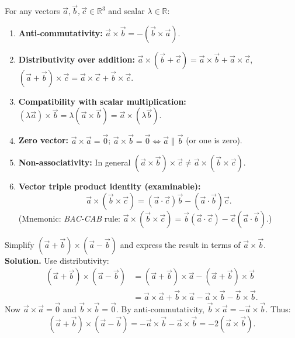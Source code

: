 \documentclass[11pt]{article}
\begin{document}
\begin{propriete}
For any vectors $\vec{a},\vec{b},\vec{c}\in\mathbb{R}^3$ and scalar $\lambda\in\mathbb{R}$:
\begin{enumerate}
\item \textbf{Anti-commutativity:} $\vec{a}\times\vec{b} = -(\vec{b}\times\vec{a})$.
\item \textbf{Distributivity over addition:}
$\vec{a}\times(\vec{b}+\vec{c}) = \vec{a}\times\vec{b}+\vec{a}\times\vec{c}$,
$(\vec{a}+\vec{b})\times\vec{c} = \vec{a}\times\vec{c}+\vec{b}\times\vec{c}$.
\item \textbf{Compatibility with scalar multiplication:}
$(\lambda\vec{a})\times\vec{b} = \lambda(\vec{a}\times\vec{b}) = \vec{a}\times(\lambda\vec{b})$.
\item \textbf{Zero vector:} $\vec{a}\times\vec{a}=\vec{0}$; $\vec{a}\times\vec{b}=\vec{0} \iff \vec{a}\parallel\vec{b}$ (or one is zero).
\item \textbf{Non-associativity:} In general $(\vec{a}\times\vec{b})\times\vec{c} \neq \vec{a}\times(\vec{b}\times\vec{c})$.
\item \textbf{Vector triple product identity (examinable):}
\[
\vec{a}\times(\vec{b}\times\vec{c}) = (\vec{a}\cdot\vec{c})\vec{b} - (\vec{a}\cdot\vec{b})\vec{c}.
\]
(Mnemonic: \emph{BAC-CAB} rule: $\vec{a}\times(\vec{b}\times\vec{c}) = \vec{b}(\vec{a}\cdot\vec{c}) - \vec{c}(\vec{a}\cdot\vec{b})$.)
\end{enumerate}
\end{propriete}

\begin{exoresolu}
Simplify $(\vec{a}+\vec{b})\times(\vec{a}-\vec{b})$ and express the result in terms of $\vec{a}\times\vec{b}$.
\tcblower
\textbf{Solution.}
Use distributivity:
\begin{align*}
(\vec{a}+\vec{b})\times(\vec{a}-\vec{b})
&= (\vec{a}+\vec{b})\times\vec{a} - (\vec{a}+\vec{b})\times\vec{b} \\
&= \vec{a}\times\vec{a} + \vec{b}\times\vec{a} - \vec{a}\times\vec{b} - \vec{b}\times\vec{b}.
\end{align*}
Now $\vec{a}\times\vec{a}=\vec{0}$ and $\vec{b}\times\vec{b}=\vec{0}$. By anti-commutativity, $\vec{b}\times\vec{a} = -\vec{a}\times\vec{b}$.
Thus:
\[
(\vec{a}+\vec{b})\times(\vec{a}-\vec{b}) = -\vec{a}\times\vec{b} - \vec{a}\times\vec{b} = -2(\vec{a}\times\vec{b}).
\]
\end{exoresolu}
\end{document}
